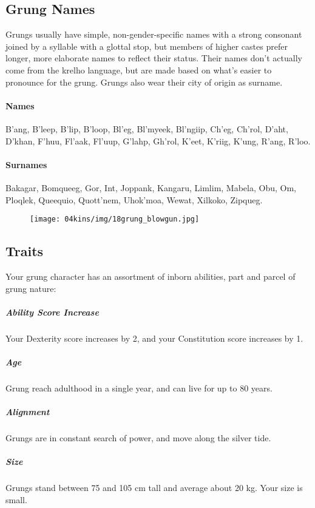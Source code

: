 \subsection*{Grung Names}
Grungs usually have simple, non-gender-specific names with a strong consonant joined by a syllable with a glottal stop, but members of higher castes prefer longer, more elaborate names to reflect their status.
Their names don't actually come from the krelho language, but are made based on what's easier to pronounce for the grung.
Grungs also wear their city of origin as surname.

\paragraph{Names}
B'ang, B'leep, B'lip, B'loop, Bl'eg, Bl'myeek, Bl'ngiip, Ch'eg, Ch'rol, D'aht, D'khan, F'huu, Fl'aak, Fl'uup, G'lahp, Gh'rol, K'eet, K'riig, K'ung, R'ang, R'loo.

\paragraph{Surnames} Bakagar, Bomqueeg, Gor, Int, Joppank, Kangaru, Limlim, Mabela, Obu, Om, Ploqlek, Queequio, Quott'nem, Uhok'moa, Wewat, Xilkoko, Zipqueg.

\begin{figure}[!t]
    \centering
    \texttt{[image: 04kins/img/18grung\_blowgun.jpg]}
\end{figure}

\subsection*{Traits}
Your grung character has an assortment of inborn abilities, part and parcel of grung nature:

\subparagraph{Ability Score Increase} Your Dexterity score increases by 2, and your Constitution score increases by 1.

\subparagraph{Age} Grung reach adulthood in a single year, and can live for up to 80 years.

\subparagraph{Alignment} %
Grungs are in constant search of power, and move along the silver tide.

\subparagraph{Size} Grungs stand between 75 and 105 cm tall and average about 20 kg.
Your size is small.

